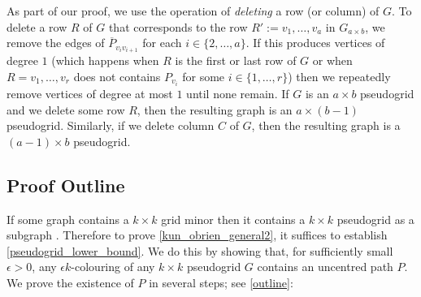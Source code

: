 \documentclass{patmorin}
\newcommand{\defin}[1]{\emph{\color{brightmaroon}#1}}
\begin{document}
As part of our proof, we use the operation of \defin{deleting} a row (or column) of $G$.  To delete a row $R$ of $G$ that corresponds to the row $R':=v_1,\ldots,v_a$ in $G_{a\times b}$, we remove the edges of $\overline{P}_{v_{i}v_{i+1}}$ for each $i\in\{2,\ldots,a\}$.  If this produces vertices of degree $1$ (which happens when $R$ is the first or last row of $G$ or when $R=v_1,\ldots,v_r$ does not contains $P_{v_i}$ for some $i\in\{1,\ldots,r\}$) then we repeatedly remove vertices of degree at most $1$ until none remain.  If $G$ is an $a\times b$ pseudogrid and we delete some row $R$, then the resulting graph is an $a\times (b-1)$ pseudogrid.  Similarly, if we delete column $C$ of $G$, then the resulting graph is a $(a-1)\times b$ pseudogrid.

\subsection{Proof Outline}

If some graph contains a $k\times k$ grid minor then it contains a $k\times k$ pseudogrid as a subgraph \cite{kun.obrien.ea:polynomial}.  Therefore to prove \cref{kun_obrien_general2}, it suffices to establish \cref{pseudogrid_lower_bound}.  We do this by showing that, for sufficiently small $\epsilon >0$, any $\epsilon k$-colouring of any $k\times k$ pseudogrid $G$ contains an uncentred path $P$. We prove the existence of $P$ in several steps; see \cref{outline}:
\end{document}
